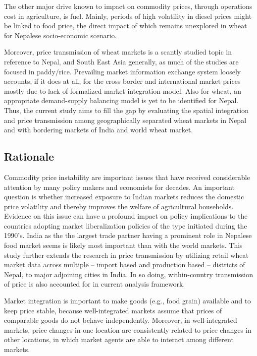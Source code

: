 \documentclass[12pt,]{article}
\begin{document}
The other major drive known to impact on commodity prices, through operations cost in agriculture, is fuel. Mainly, periods of high volatility in diesel prices might be linked to food price, the direct impact of which remains unexplored in wheat for Nepalese socio-economic scenario.

Moreover, price transmission of wheat markets is a scantly studied topic in reference to Nepal, and South East Asia generally, as much of the studies are focused in paddy/rice. Prevailing market information exchange system loosely accounts, if it does at all, for the cross border and international market prices mostly due to lack of formalized market integration model. Also for wheat, an appropriate demand-supply balancing model is yet to be identified for Nepal. Thus, the current study aims to fill the gap by evaluating the spatial integration and price transmission among geographically separated wheat markets in Nepal and with bordering markets of India and world wheat market.

\hypertarget{rationale}{%
\subsection{Rationale}\label{rationale}}

Commodity price instability are important issues that have received considerable attention by many policy makers and economists for decades. An important question is whether increased exposure to Indian markets reduces the domestic price volatility and thereby improves the welfare of agricultural households. Evidence on this issue can have a profound impact on policy implications to the countries adopting market liberalization policies of the type initiated during the 1990's. India as the the largest trade partner having a prominent role in Nepalese food market seems is likely most important than with the world markets. This study further extends the research in price transmission by utilizing retail wheat market data across multiple -- import based and production based -- districts of Nepal, to major adjoining cities in India. In so doing, within-country transmission of price is also accounted for in current analysis framework.

Market integration is important to make goods (e.g., food grain) available and to keep price stable, because well-integrated markets assume that prices of comparable goods do not behave independently. Moreover, in well-integrated markets, price changes in one location are consistently related to price changes in other locations, in which market agents are able to interact among different markets.
\end{document}
